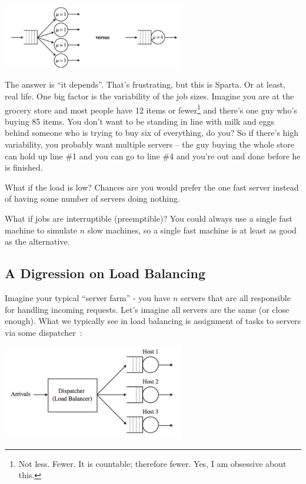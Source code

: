 \begin{center}
	\includegraphics[width=0.6\textwidth]{images/qt-example3.png}
\end{center}

The answer is ``it depends''. That's frustrating, but this is Sparta. Or at least, real life. One big factor is the variability of the job sizes. Imagine you are at the grocery store and most people have 12 items or fewer\footnote{Not less. Fewer. It is countable; therefore fewer. Yes, I am obsessive about this.} and there's one guy who's buying 85 items. You don't want to be standing in line with milk and eggs behind someone who is trying to buy six of everything, do you? So if there's high variability, you probably want multiple servers -- the guy buying the whole store can hold up line \#1 and you can go to line \#4 and you're out and done before he is finished.

What if the load is low? Chances are you would prefer the one fast server instead of having some number of servers doing nothing.

What if jobs are interruptible (preemptible)? You could always use a single fast machine to simulate $n$ slow machines, so a single fast machine is at least as good as the alternative. 

\subsection*{A Digression on Load Balancing}

Imagine your typical ``server farm'' - you have $n$ servers that are all responsible for handling incoming requests. Let's imagine all servers are the same (or close enough). What we typically see in load balancing is assignment of tasks to servers via some dispatcher~\cite{pmd}:

\begin{center}
	\includegraphics[width=0.6\textwidth]{images/central-dispatcher.png}
\end{center}

